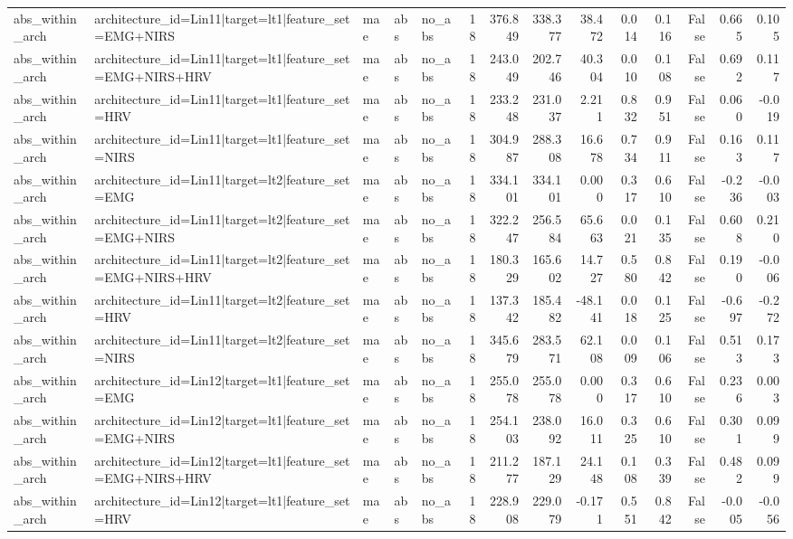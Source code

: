 \begin{table}
\begin{tabular}{lllllrrrrrrrrr}
abs_within_arch & architecture_id=Lin11|target=lt1|feature_set=EMG+NIRS & mae & abs & no_abs & 18 & 376.849 & 338.377 & 38.472 & 0.014 & 0.116 & False & 0.665 & 0.105 \\
abs_within_arch & architecture_id=Lin11|target=lt1|feature_set=EMG+NIRS+HRV & mae & abs & no_abs & 18 & 243.049 & 202.746 & 40.304 & 0.010 & 0.108 & False & 0.692 & 0.117 \\
abs_within_arch & architecture_id=Lin11|target=lt1|feature_set=HRV & mae & abs & no_abs & 18 & 233.248 & 231.037 & 2.211 & 0.832 & 0.951 & False & 0.060 & -0.019 \\
abs_within_arch & architecture_id=Lin11|target=lt1|feature_set=NIRS & mae & abs & no_abs & 18 & 304.987 & 288.308 & 16.678 & 0.734 & 0.911 & False & 0.163 & 0.117 \\
abs_within_arch & architecture_id=Lin11|target=lt2|feature_set=EMG & mae & abs & no_abs & 18 & 334.101 & 334.101 & 0.000 & 0.317 & 0.610 & False & -0.236 & -0.003 \\
abs_within_arch & architecture_id=Lin11|target=lt2|feature_set=EMG+NIRS & mae & abs & no_abs & 18 & 322.247 & 256.584 & 65.663 & 0.021 & 0.135 & False & 0.608 & 0.210 \\
abs_within_arch & architecture_id=Lin11|target=lt2|feature_set=EMG+NIRS+HRV & mae & abs & no_abs & 18 & 180.329 & 165.602 & 14.727 & 0.580 & 0.842 & False & 0.190 & -0.006 \\
abs_within_arch & architecture_id=Lin11|target=lt2|feature_set=HRV & mae & abs & no_abs & 18 & 137.342 & 185.482 & -48.141 & 0.018 & 0.125 & False & -0.697 & -0.272 \\
abs_within_arch & architecture_id=Lin11|target=lt2|feature_set=NIRS & mae & abs & no_abs & 18 & 345.679 & 283.571 & 62.108 & 0.009 & 0.106 & False & 0.513 & 0.173 \\
abs_within_arch & architecture_id=Lin12|target=lt1|feature_set=EMG & mae & abs & no_abs & 18 & 255.078 & 255.078 & 0.000 & 0.317 & 0.610 & False & 0.236 & 0.003 \\
abs_within_arch & architecture_id=Lin12|target=lt1|feature_set=EMG+NIRS & mae & abs & no_abs & 18 & 254.103 & 238.092 & 16.011 & 0.325 & 0.610 & False & 0.301 & 0.099 \\
abs_within_arch & architecture_id=Lin12|target=lt1|feature_set=EMG+NIRS+HRV & mae & abs & no_abs & 18 & 211.277 & 187.129 & 24.148 & 0.108 & 0.339 & False & 0.482 & 0.099 \\
abs_within_arch & architecture_id=Lin12|target=lt1|feature_set=HRV & mae & abs & no_abs & 18 & 228.908 & 229.079 & -0.171 & 0.551 & 0.842 & False & -0.005 & -0.056 \\

\end{tabular}
\end{table}
